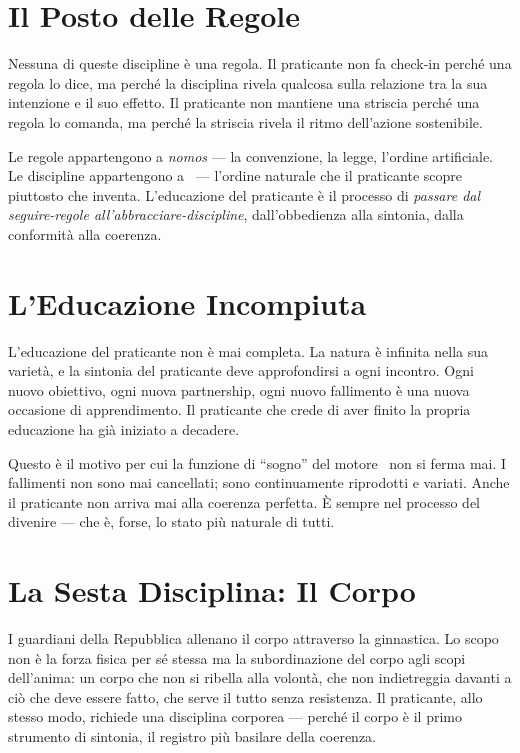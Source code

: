 \section{Il Posto delle Regole}

Nessuna di queste discipline \`e una regola. Il praticante non fa
check-in perch\'e una regola lo dice, ma perch\'e la disciplina rivela
qualcosa sulla relazione tra la sua intenzione e il suo effetto. Il
praticante non mantiene una striscia perch\'e una regola lo comanda,
ma perch\'e la striscia rivela il ritmo dell'azione sostenibile.

Le regole appartengono a \emph{nomos} --- la convenzione, la legge,
l'ordine artificiale. Le discipline appartengono a \physis\ --- l'ordine
naturale che il praticante scopre piuttosto che inventa. L'educazione
del praticante \`e il processo di \emph{passare dal seguire-regole
all'abbracciare-discipline}, dall'obbedienza alla sintonia, dalla
conformit\`a alla coerenza.

\section{L'Educazione Incompiuta}

L'educazione del praticante non \`e mai completa. La natura \`e infinita
nella sua variet\`a, e la sintonia del praticante deve approfondirsi a
ogni incontro. Ogni nuovo obiettivo, ogni nuova partnership, ogni nuovo
fallimento \`e una nuova occasione di apprendimento. Il praticante che
crede di aver finito la propria educazione ha gi\`a iniziato a decadere.

Questo \`e il motivo per cui la funzione di ``sogno'' del motore
\physis\ non si ferma mai. I fallimenti non sono mai cancellati; sono
continuamente riprodotti e variati. Anche il praticante non arriva mai
alla coerenza perfetta. \`E sempre nel processo del divenire --- che
\`e, forse, lo stato pi\`u naturale di tutti.

\section{La Sesta Disciplina: Il Corpo}

I guardiani della Repubblica allenano il corpo attraverso la ginnastica.
Lo scopo non \`e la forza fisica per s\'e stessa ma la subordinazione
del corpo agli scopi dell'anima: un corpo che non si ribella alla
volont\`a, che non indietreggia davanti a ci\`o che deve essere fatto,
che serve il tutto senza resistenza. Il praticante, allo stesso modo,
richiede una disciplina corporea --- perch\'e il corpo \`e il primo
strumento di sintonia, il registro pi\`u basilare della coerenza.

